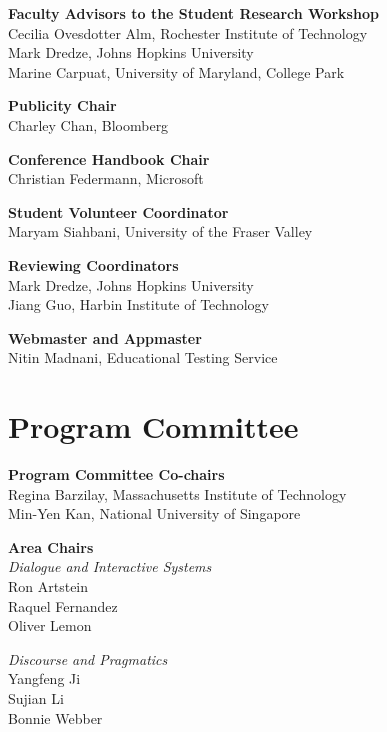 {\bf Faculty Advisors to the Student Research Workshop} \\
Cecilia Ovesdotter Alm, Rochester Institute of Technology \\
Mark Dredze, Johns Hopkins University \\
Marine Carpuat, University of Maryland, College Park

{\bf Publicity Chair} \\
Charley Chan, Bloomberg

{\bf Conference Handbook Chair} \\
Christian Federmann, Microsoft

{\bf Student Volunteer Coordinator} \\
Maryam Siahbani, University of the Fraser Valley

{\bf Reviewing Coordinators} \\
Mark Dredze, Johns Hopkins University \\
Jiang Guo, Harbin Institute of Technology

{\bf Webmaster and Appmaster} \\
Nitin Madnani, Educational Testing Service


\clearpage
\section{Program Committee}
\setlength{\parindent}{0pt}

\vspace*{0.5cm}

{\bf Program Committee Co-chairs} \\
Regina Barzilay, Massachusetts Institute of Technology \\
Min-Yen Kan, National University of Singapore

{\bf Area Chairs} \\
\emph{Dialogue and Interactive Systems} \\
\hspace*{0.2in} Ron Artstein \\
\hspace*{0.2in} Raquel Fernandez \\
\hspace*{0.2in} Oliver Lemon

\emph{Discourse and Pragmatics} \\
\hspace*{0.2in} Yangfeng Ji \\
\hspace*{0.2in} Sujian Li \\
\hspace*{0.2in} Bonnie Webber
 
